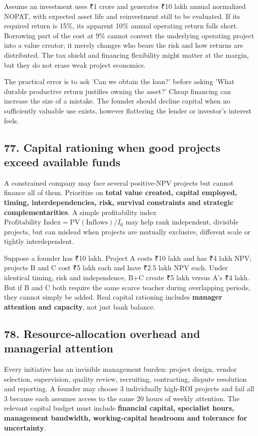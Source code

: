 Assume an investment uses ₹1 crore and generates ₹10 lakh annual normalized NOPAT, with expected asset life and reinvestment still to be evaluated. If its required return is 15\%, its apparent 10\% annual operating return falls short. Borrowing part of the cost at 9\% cannot convert the underlying operating project into a value creator; it merely changes who bears the risk and how returns are distributed. The tax shield and financing flexibility might matter at the margin, but they do not erase weak project economics.

The practical error is to ask 'Can we obtain the loan?' before asking 'What durable productive return justifies owning the asset?' Cheap financing can increase the size of a mistake. The founder should decline capital when no sufficiently valuable use exists, however flattering the lender or investor's interest feels.

\subsection{77. Capital rationing when good projects exceed available funds}


A constrained company may face several positive-NPV projects but cannot finance all of them. Prioritize on \textbf{total value created, capital employed, timing, interdependencies, risk, survival constraints and strategic complementarities}. A simple profitability index $\text{Profitability Index} = \mathrm{PV}(\text{Inflows}) / I_0$ may help rank independent, divisible projects, but can mislead when projects are mutually exclusive, different scale or tightly interdependent.

Suppose a founder has ₹10 lakh. Project A costs ₹10 lakh and has ₹4 lakh NPV; projects B and C cost ₹5 lakh each and have ₹2.5 lakh NPV each. Under identical timing, risk and independence, B+C create ₹5 lakh versus A's ₹4 lakh. But if B and C both require the same scarce teacher during overlapping periods, they cannot simply be added. Real capital rationing includes \textbf{manager attention and capacity}, not just bank balance.

\subsection{78. Resource-allocation overhead and managerial attention}


Every initiative has an invisible management burden: project design, vendor selection, supervision, quality review, recruiting, contracting, dispute resolution and reporting. A founder may choose 3 individually high-ROI projects and fail all 3 because each assumes access to the same 20 hours of weekly attention. The relevant capital budget must include \textbf{financial capital, specialist hours, management bandwidth, working-capital headroom and tolerance for uncertainty}.

